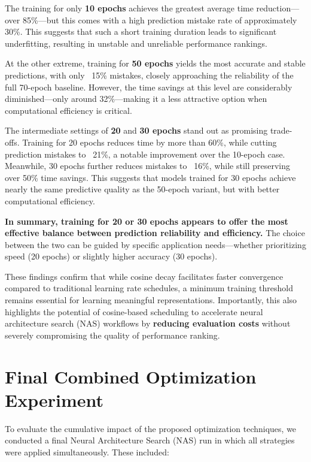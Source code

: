 The training for only \textbf{10 epochs} achieves the greatest average time reduction—over 85\%—but this comes with a high prediction mistake rate of approximately 30\%. This suggests that such a short training duration leads to significant underfitting, resulting in unstable and unreliable performance rankings.

At the other extreme, training for \textbf{50 epochs} yields the most accurate and stable predictions, with only ~15\% mistakes, closely approaching the reliability of the full 70-epoch baseline. However, the time savings at this level are considerably diminished—only around 32\%—making it a less attractive option when computational efficiency is critical.

The intermediate settings of \textbf{20} and \textbf{30 epochs} stand out as promising trade-offs. Training for 20 epochs reduces time by more than 60\%, while cutting prediction mistakes to ~21\%, a notable improvement over the 10-epoch case. Meanwhile, 30 epochs further reduces mistakes to ~16\%, while still preserving over 50\% time savings. This suggests that models trained for 30 epochs achieve nearly the same predictive quality as the 50-epoch variant, but with better computational efficiency.

\textbf{In summary, training for 20 or 30 epochs appears to offer the most effective balance between prediction reliability and efficiency.} The choice between the two can be guided by specific application needs—whether prioritizing speed (20 epochs) or slightly higher accuracy (30 epochs).

These findings confirm that while cosine decay facilitates faster convergence compared to traditional learning rate schedules, a minimum training threshold remains essential for learning meaningful representations. Importantly, this also highlights the potential of cosine-based scheduling to accelerate neural architecture search (NAS) workflows by \textbf{reducing evaluation costs} without severely compromising the quality of performance ranking.


\section{Final Combined Optimization Experiment}

To evaluate the cumulative impact of the proposed optimization techniques, we conducted a final Neural Architecture Search (NAS) run in which all strategies were applied simultaneously. These included:

